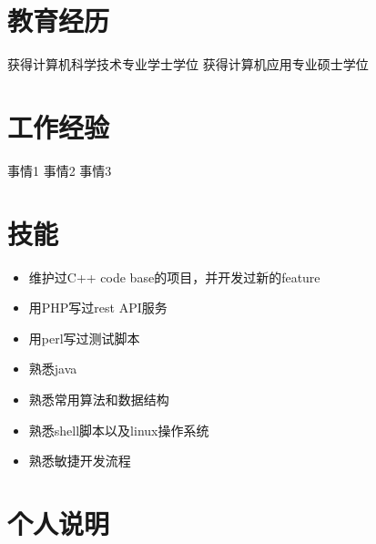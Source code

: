 \documentclass{resume}
\begin{document}
\begin{CJK}{UTF8}{gbsn}
\section{教育经历}
获得计算机科学技术专业学士学位
获得计算机应用专业硕士学位
 
\section{工作经验}
\workitems
{事情1}
{事情2}
{事情3}

\section{技能}
\begin{itemize}
\item 维护过C++ code base的项目，并开发过新的feature 
\item 用PHP写过rest API服务
\item 用perl写过测试脚本
\item 熟悉java
\item 熟悉常用算法和数据结构
\item 熟悉shell脚本以及linux操作系统
\item 熟悉敏捷开发流程
\end{itemize}

\section{个人说明}
\end{CJK}
\end{document}

